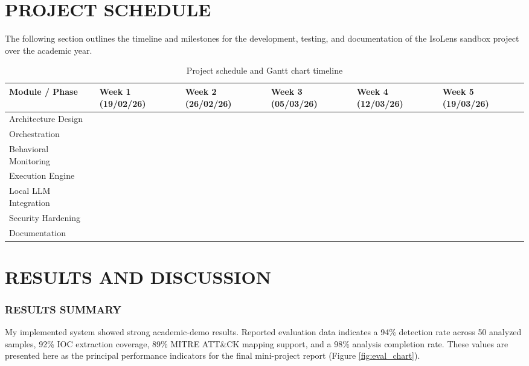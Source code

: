 \documentclass[a4paper,12pt,oneside]{report}
\begin{document}
\chapter{PROJECT SCHEDULE}
The following section outlines the timeline and milestones for the development, testing, and documentation of the IsoLens sandbox project over the academic year.

\begin{table}[H]
\centering
\caption{Project schedule and Gantt chart timeline}
\label{tab:project_schedule}
\renewcommand{\arraystretch}{1.5}
\setlength{\tabcolsep}{3pt}
\begin{tabularx}{\textwidth}{>{\raggedright\arraybackslash}X >{\centering\arraybackslash}p{2cm} >{\centering\arraybackslash}p{2cm} >{\centering\arraybackslash}p{2cm} >{\centering\arraybackslash}p{2cm} >{\centering\arraybackslash}p{2cm}}
\toprule
\rowcolor{black!10}
\textbf{Module / Phase} & \textbf{Week 1 \newline(19/02/26)} & \textbf{Week 2 \newline(26/02/26)} & \textbf{Week 3 \newline(05/03/26)} & \textbf{Week 4 \newline(12/03/26)} & \textbf{Week 5 \newline(19/03/26)} \\
\midrule
Architecture Design & \cellcolor{black!70} & & & & \\
Orchestration & \cellcolor{black!70} & \cellcolor{black!70} & & & \\
Behavioral Monitoring & & \cellcolor{black!70} & \cellcolor{black!70} & & \\
Execution Engine & & & \cellcolor{black!70} & & \\
Local LLM Integration & & & & \cellcolor{black!70} & \\
Security Hardening & & & & \cellcolor{black!70} & \cellcolor{black!70} \\
Documentation & & & & & \cellcolor{black!70} \\
\bottomrule
\end{tabularx}
\end{table}


\chapter{RESULTS AND DISCUSSION}
\subsection{RESULTS SUMMARY}
My implemented system showed strong academic-demo results. Reported evaluation data indicates a 94\% detection rate across 50 analyzed samples, 92\% IOC extraction coverage, 89\% MITRE ATT\&CK mapping support, and a 98\% analysis completion rate. These values are presented here as the principal performance indicators for the final mini-project report (Figure \ref{fig:eval_chart}).
\end{document}
